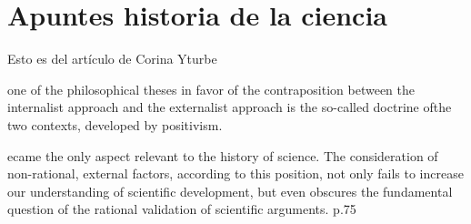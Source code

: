\section{Apuntes historia de la ciencia}

Esto es del artículo de Corina Yturbe

one of the philosophical theses in favor of the contraposition between the internalist approach and the externalist approach is the so-called doctrine ofthe two contexts, developed by positivism.

ecame the only aspect relevant to the history of science. The consideration of non-rational, external factors, according to this position, not only fails to increase our understanding of scientific development, but even obscures the fundamental question of the rational validation of scientific arguments. p.75
